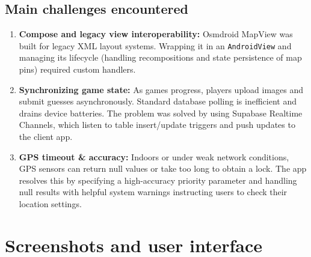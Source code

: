 \documentclass[11pt,a4paper]{article}
\begin{document}
\subsection{Main challenges encountered}
\begin{enumerate}
    \item \textbf{Compose and legacy view interoperability:} Osmdroid MapView was built for legacy XML layout systems. Wrapping it in an \texttt{AndroidView} and managing its lifecycle (handling recompositions and state persistence of map pins) required custom handlers.
    \item \textbf{Synchronizing game state:} As games progress, players upload images and submit guesses asynchronously. Standard database polling is inefficient and drains device batteries. The problem was solved by using Supabase Realtime Channels, which listen to table insert/update triggers and push updates to the client app.
    \item \textbf{GPS timeout \& accuracy:} Indoors or under weak network conditions, GPS sensors can return null values or take too long to obtain a lock. The app resolves this by specifying a high-accuracy priority parameter and handling null results with helpful system warnings instructing users to check their location settings.
\end{enumerate}

\newpage

\section{Screenshots and user interface}
\end{document}
